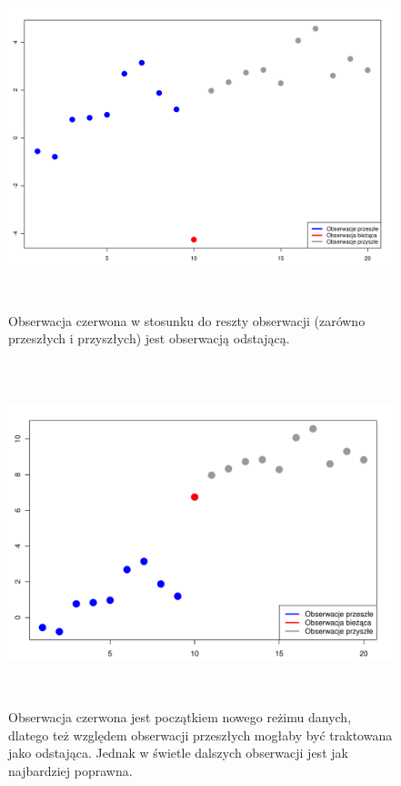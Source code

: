 \documentclass[a4paper,12pt,openany, DIV=calc, headsepline]{scrbook}
\begin{document}
\begin{figure}[H]
  \centering
  \includegraphics[width=170mm, height=100mm]{wykresy/odst1}
  \caption{Obserwacja czerwona w stosunku do reszty obserwacji (zarówno przeszłych i przyszłych) jest obserwacją odstającą.}
  \label{fig:odst1}
\end{figure}


\begin{figure}[H]
  \centering
  \includegraphics[width=170mm, height=100mm]{wykresy/odst2}
  \caption{Obserwacja czerwona jest początkiem nowego reżimu danych, dlatego też względem obserwacji przeszłych mogłaby być traktowana jako odstająca. Jednak w świetle dalszych obserwacji jest jak najbardziej poprawna.}
  \label{fig:odst2}
\end{figure}
\end{document}
